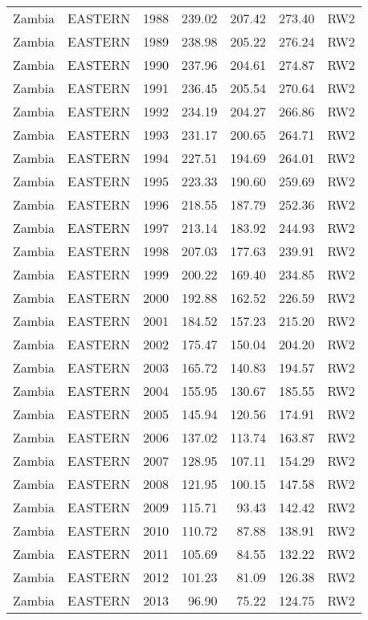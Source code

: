 \begin{longtable}{lllrrrl}
  Zambia & EASTERN & 1988 & 239.02 & 207.42 & 273.40 & RW2 \\ 
  Zambia & EASTERN & 1989 & 238.98 & 205.22 & 276.24 & RW2 \\ 
  Zambia & EASTERN & 1990 & 237.96 & 204.61 & 274.87 & RW2 \\ 
  Zambia & EASTERN & 1991 & 236.45 & 205.54 & 270.64 & RW2 \\ 
  Zambia & EASTERN & 1992 & 234.19 & 204.27 & 266.86 & RW2 \\ 
  Zambia & EASTERN & 1993 & 231.17 & 200.65 & 264.71 & RW2 \\ 
  Zambia & EASTERN & 1994 & 227.51 & 194.69 & 264.01 & RW2 \\ 
  Zambia & EASTERN & 1995 & 223.33 & 190.60 & 259.69 & RW2 \\ 
  Zambia & EASTERN & 1996 & 218.55 & 187.79 & 252.36 & RW2 \\ 
  Zambia & EASTERN & 1997 & 213.14 & 183.92 & 244.93 & RW2 \\ 
  Zambia & EASTERN & 1998 & 207.03 & 177.63 & 239.91 & RW2 \\ 
  Zambia & EASTERN & 1999 & 200.22 & 169.40 & 234.85 & RW2 \\ 
  Zambia & EASTERN & 2000 & 192.88 & 162.52 & 226.59 & RW2 \\ 
  Zambia & EASTERN & 2001 & 184.52 & 157.23 & 215.20 & RW2 \\ 
  Zambia & EASTERN & 2002 & 175.47 & 150.04 & 204.20 & RW2 \\ 
  Zambia & EASTERN & 2003 & 165.72 & 140.83 & 194.57 & RW2 \\ 
  Zambia & EASTERN & 2004 & 155.95 & 130.67 & 185.55 & RW2 \\ 
  Zambia & EASTERN & 2005 & 145.94 & 120.56 & 174.91 & RW2 \\ 
  Zambia & EASTERN & 2006 & 137.02 & 113.74 & 163.87 & RW2 \\ 
  Zambia & EASTERN & 2007 & 128.95 & 107.11 & 154.29 & RW2 \\ 
  Zambia & EASTERN & 2008 & 121.95 & 100.15 & 147.58 & RW2 \\ 
  Zambia & EASTERN & 2009 & 115.71 & 93.43 & 142.42 & RW2 \\ 
  Zambia & EASTERN & 2010 & 110.72 & 87.88 & 138.91 & RW2 \\ 
  Zambia & EASTERN & 2011 & 105.69 & 84.55 & 132.22 & RW2 \\ 
  Zambia & EASTERN & 2012 & 101.23 & 81.09 & 126.38 & RW2 \\ 
  Zambia & EASTERN & 2013 & 96.90 & 75.22 & 124.75 & RW2 \\ 

\end{longtable}
